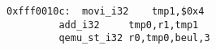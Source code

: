 \begin{lstlisting}[]
0xfff0010c:  movi_i32    tmp1,$0x4
	     add_i32     tmp0,r1,tmp1
	     qemu_st_i32 r0,tmp0,beul,3
\end{lstlisting}
